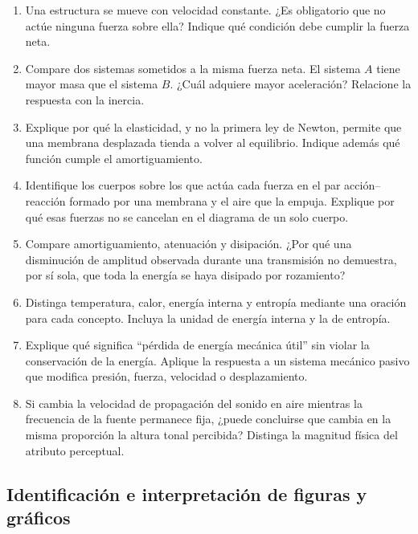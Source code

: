 \begin{enumerate}[label=\textbf{C\arabic*.},leftmargin=*]
    \item Una estructura se mueve con velocidad constante. ¿Es obligatorio que
    no actúe ninguna fuerza sobre ella? Indique qué condición debe cumplir la
    fuerza neta.

    \item Compare dos sistemas sometidos a la misma fuerza neta. El sistema
    \(A\) tiene mayor masa que el sistema \(B\). ¿Cuál adquiere mayor
    aceleración? Relacione la respuesta con la inercia.

    \item Explique por qué la elasticidad, y no la primera ley de Newton,
    permite que una membrana desplazada tienda a volver al equilibrio. Indique
    además qué función cumple el amortiguamiento.

    \item Identifique los cuerpos sobre los que actúa cada fuerza en el par
    acción--reacción formado por una membrana y el aire que la empuja. Explique
    por qué esas fuerzas no se cancelan en el diagrama de un solo cuerpo.

    \item Compare amortiguamiento, atenuación y disipación. ¿Por qué una
    disminución de amplitud observada durante una transmisión no demuestra, por
    sí sola, que toda la energía se haya disipado por rozamiento?

    \item Distinga temperatura, calor, energía interna y entropía mediante una
    oración para cada concepto. Incluya la unidad de energía interna y la de
    entropía.

    \item Explique qué significa ``pérdida de energía mecánica útil'' sin
    violar la conservación de la energía. Aplique la respuesta a un sistema
    mecánico pasivo que modifica presión, fuerza, velocidad o desplazamiento.

    \item Si cambia la velocidad de propagación del sonido en aire mientras la
    frecuencia de la fuente permanece fija, ¿puede concluirse que cambia en la
    misma proporción la altura tonal percibida? Distinga la magnitud física del
    atributo perceptual.
\end{enumerate}

\subsection*{Identificación e interpretación de figuras y gráficos}


